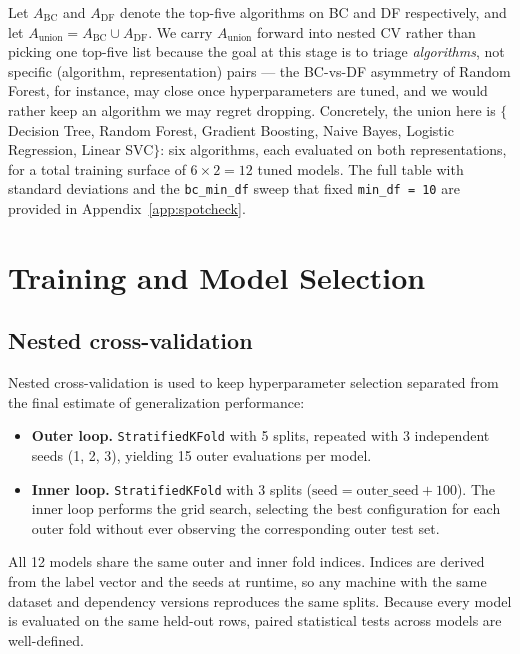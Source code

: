 \documentclass{article}
\begin{document}
Let $A_{\text{BC}}$ and $A_{\text{DF}}$ denote the top-five algorithms on BC and DF respectively, and let $A_{\text{union}} = A_{\text{BC}} \cup A_{\text{DF}}$. We carry $A_{\text{union}}$ forward into nested CV rather than picking one top-five list because the goal at this stage is to triage \textit{algorithms}, not specific (algorithm, representation) pairs --- the BC-vs-DF asymmetry of Random Forest, for instance, may close once hyperparameters are tuned, and we would rather keep an algorithm we may regret dropping. Concretely, the union here is $\{$Decision Tree, Random Forest, Gradient Boosting, Naive Bayes, Logistic Regression, Linear SVC$\}$: six algorithms, each evaluated on both representations, for a total training surface of $6 \times 2 = 12$ tuned models. The full table with standard deviations and the \texttt{bc\_min\_df} sweep that fixed \texttt{min\_df = 10} are provided in Appendix~\ref{app:spotcheck}.

\section{Training and Model Selection}
\label{sec:training}

\subsection{Nested cross-validation}
\label{sec:training:nestedcv}

Nested cross-validation is used to keep hyperparameter selection separated from the final estimate of generalization performance:

\begin{itemize}
  \item \textbf{Outer loop.} \texttt{StratifiedKFold} with 5 splits, repeated with 3 independent seeds (1, 2, 3), yielding 15 outer evaluations per model.
  \item \textbf{Inner loop.} \texttt{StratifiedKFold} with 3 splits ($\text{seed} = \text{outer\_seed} + 100$). The inner loop performs the grid search, selecting the best configuration for each outer fold without ever observing the corresponding outer test set.
\end{itemize}

All 12 models share the same outer and inner fold indices. Indices are derived from the label vector and the seeds at runtime, so any machine with the same dataset and dependency versions reproduces the same splits. Because every model is evaluated on the same held-out rows, paired statistical tests across models are well-defined.
\end{document}
